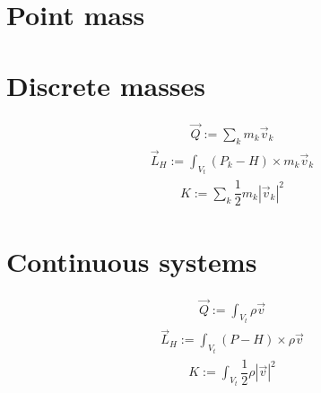 \documentclass[letterpaper,10pt,english]{jupyterBook}
\begin{document}
\section{Point mass}
\label{\detokenize{ch/inertia:point-mass}}

\section{Discrete masses}
\label{\detokenize{ch/inertia:discrete-masses}}
\sphinxAtStartPar
{}
\begin{equation*}
\begin{split}\vec{Q} := \sum_k m_k \vec{v}_k \end{split}
\end{equation*}
\sphinxAtStartPar
{}
\begin{equation*}
\begin{split}\vec{L}_H := \int_{V_t} (P_k - H) \times m_k \vec{v}_k \end{split}
\end{equation*}
\sphinxAtStartPar
{}
\begin{equation*}
\begin{split}K := \sum_k \dfrac{1}{2} m_k |\vec{v}_k|^2\end{split}
\end{equation*}

\section{Continuous systems}
\label{\detokenize{ch/inertia:continuous-systems}}
\sphinxAtStartPar
{}
\begin{equation*}
\begin{split}\vec{Q} := \int_{V_t} \rho \vec{v} \end{split}
\end{equation*}
\sphinxAtStartPar
{}
\begin{equation*}
\begin{split}\vec{L}_H := \int_{V_t} (P - H) \times \rho \vec{v} \end{split}
\end{equation*}
\sphinxAtStartPar
{}
\begin{equation*}
\begin{split}K := \int_{V_t} \dfrac{1}{2} \rho |\vec{v}|^2\end{split}
\end{equation*}
\end{document}
